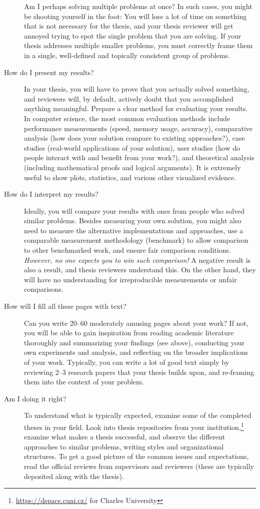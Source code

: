 \begin{description}
Am I perhaps solving multiple problems at once? In such cases, you might be shooting yourself in the foot: You will lose a lot of time on something that is not necessary for the thesis, and your thesis reviewer will get annoyed trying to spot the single problem that you are solving. If your thesis addresses multiple smaller problems, you must correctly frame them in a single, well-defined and topically consistent group of problems.
\item[How do I present my results?]
In your thesis, you will have to prove that you actually solved something, and reviewers will, by default, actively doubt that you accomplished anything meaningful. Prepare a clear method for evaluating your results. In computer science, the most common evaluation methods include performance measurements (speed, memory usage, accuracy), comparative analysis (how does your solution compare to existing approaches?), case studies (real-world applications of your solution), user studies (how do people interact with and benefit from your work?), and theoretical analysis (including mathematical proofs and logical arguments). It is extremely useful to show plots, statistics, and various other visualized evidence.
\item[How do I interpret my results?]
Ideally, you will compare your results with ones from people who solved similar problems. Besides measuring your own solution, you might also need to measure the alternative implementations and approaches, use a comparable measurement methodology (benchmark) to allow comparison to other benchmarked work, and ensure fair comparison conditions. \emph{However, no one expects you to win such comparison!} A negative result is also a result, and thesis reviewers understand this. On the other hand, they will have no understanding for irreproducible measurements or unfair comparisons.
\item[How will I fill all these pages with text?]
Can you write 20--60 moderately amusing pages about your work? If not, you will be able to gain inspiration from reading academic literature thoroughly and summarizing your findings (see above), conducting your own experiments and analysis, and reflecting on the broader implications of your work. Typically, you can write a lot of good text simply by reviewing 2--3 research papers that your thesis builds upon, and re-framing them into the context of your problem.
\item[Am I doing it right?]
To understand what is typically expected, examine some of the completed theses in your field. Look into thesis repositories from your institution,\footnote{\url{https://dspace.cuni.cz/} for Charles University} examine what makes a thesis successful, and observe the different approaches to similar problems, writing styles and organizational structures. To get a good picture of the common issues and expectations, read the official reviews from supervisors and reviewers (these are typically deposited along with the thesis).

\end{description}
